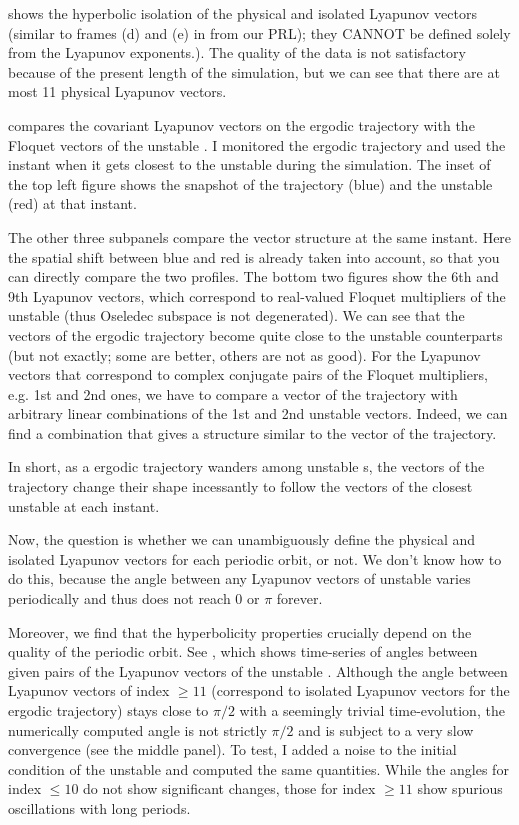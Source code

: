 \begin{description}
 shows the hyperbolic isolation of the physical and
isolated Lyapunov vectors (similar to frames (d) and (e) in 
from our PRL); they
CANNOT be defined solely from the Lyapunov exponents.). The quality of
the data is not satisfactory because of the present length of the
simulation, but we can see that there are at most 11 physical Lyapunov vectors.


 compares the covariant Lyapunov vectors on the
ergodic trajectory with the Floquet vectors of the {unstable \po}. I monitored the
ergodic trajectory and used the instant when it gets closest to the {unstable \po}
during the simulation. The inset of the top left figure shows the
snapshot of the trajectory (blue) and the {unstable \po} (red) at that instant.

The other three subpanels compare the vector structure at the same
instant. Here the spatial shift between blue and red is already taken
into account, so that you can directly compare the two profiles. The
bottom two figures show the 6th and 9th Lyapunov vectors, which correspond to
real-valued Floquet multipliers of the {unstable \po} (thus Oseledec subspace is
not degenerated). We can see that the vectors of the ergodic trajectory
become quite close to the {unstable \po} counterparts (but not exactly; some are
better, others are not as good). For the Lyapunov vectors that correspond
to complex conjugate pairs of the Floquet multipliers, e.g. 1st and 2nd
ones, we have to compare a vector of the trajectory with arbitrary
linear combinations of the 1st and 2nd {unstable \po} vectors. Indeed, we can find
a combination that gives a structure similar to the vector of the
trajectory.

In short, as a ergodic trajectory wanders among {unstable \po}s, the vectors of the
trajectory change their shape incessantly to follow the vectors of the
closest {unstable \po} at each instant.


Now, the question is whether we can unambiguously define the physical
and isolated Lyapunov vectors for each periodic orbit, or not. We don't know how to
do this, because the angle between any Lyapunov vectors
of {unstable \po} varies periodically and thus does not reach 0 or
$\pi$ forever.

Moreover, we find that the hyperbolicity properties crucially depend on
the quality of the periodic orbit. See
, which shows
time-series of angles between given pairs of the Lyapunov vectors of the
{unstable \po}. Although the angle between Lyapunov vectors of index $\geq 11$ (correspond
to isolated Lyapunov vectors for the ergodic trajectory) stays close to $\pi/2$ with a
seemingly trivial time-evolution, the numerically computed angle is not
strictly $\pi/2$ and is subject to a very slow convergence (see the middle
panel). To test, I added a noise to the initial condition of the {unstable \po} and
computed the same quantities. While the angles for index $\leq 10$ do not
show significant changes, those for index $\geq 11$ show spurious
oscillations with long periods.


\end{description}

